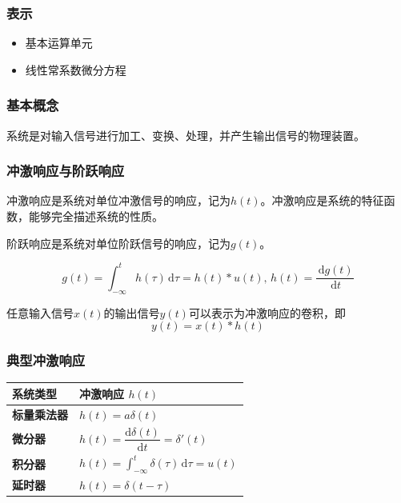 \documentclass[UTF8,fontset=fandol,zihao=5]{ctexart}
\newcommand{\dd}{\,\mathrm{d}}
\begin{document}
\subsubsection{表示}

\begin{itemize}
  \item 基本运算单元
  \item 线性常系数微分方程
\end{itemize}

\subsubsection{基本概念}
系统是对输入信号进行加工、变换、处理，并产生输出信号的物理装置。

\subsubsection{冲激响应与阶跃响应}

冲激响应是系统对单位冲激信号的响应，记为$h(t)$。冲激响应是系统的特征函数，能够完全描述系统的性质。

阶跃响应是系统对单位阶跃信号的响应，记为$g(t)$。

\begin{methodbox}[二者关系]
  \[
  g(t)=\int_{-\infty}^{t}h(\tau)\dd\tau=h(t) \ast u(t),\, h(t)=\frac{\dd g(t)}{\dd t}
  \]
\end{methodbox}

任意输入信号$x(t)$的输出信号$y(t)$可以表示为冲激响应的卷积，即
\[
y(t) = x(t) \ast h(t)
\]

\subsubsection{典型冲激响应}

\begin{center}
\begin{tabularx}{0.98\textwidth}{>{\bfseries}p{2cm}X}
\toprule
系统类型 & 冲激响应 $h(t)$ \\
\midrule
        标量乘法器 & $h(t)=a\delta(t)$ \\
        微分器 & $h(t)=\dfrac{\mathrm{d}\delta(t)}{\mathrm{d}t}=\delta'(t)$ \\
        积分器 & $h(t)=\displaystyle\int_{-\infty}^{t}\delta(\tau)\,\mathrm{d}\tau=u(t)$ \\
        延时器 & $h(t)=\delta(t-\tau)$ \\
\bottomrule
\end{tabularx}
\end{center}
\end{document}
